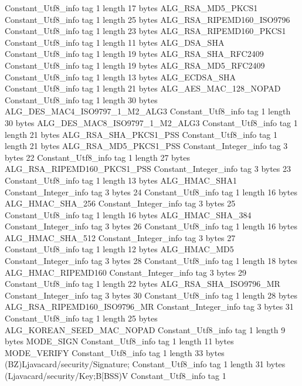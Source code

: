 {{{		}
		Constant_Utf8_info {
			tag	1
			length	17
			bytes	ALG_RSA_MD5_PKCS1
		}
		Constant_Utf8_info {
			tag	1
			length	25
			bytes	ALG_RSA_RIPEMD160_ISO9796
		}
		Constant_Utf8_info {
			tag	1
			length	23
			bytes	ALG_RSA_RIPEMD160_PKCS1
		}
		Constant_Utf8_info {
			tag	1
			length	11
			bytes	ALG_DSA_SHA
		}
		Constant_Utf8_info {
			tag	1
			length	19
			bytes	ALG_RSA_SHA_RFC2409
		}
		Constant_Utf8_info {
			tag	1
			length	19
			bytes	ALG_RSA_MD5_RFC2409
		}
		Constant_Utf8_info {
			tag	1
			length	13
			bytes	ALG_ECDSA_SHA
		}
		Constant_Utf8_info {
			tag	1
			length	21
			bytes	ALG_AES_MAC_128_NOPAD
		}
		Constant_Utf8_info {
			tag	1
			length	30
			bytes	ALG_DES_MAC4_ISO9797_1_M2_ALG3
		}
		Constant_Utf8_info {
			tag	1
			length	30
			bytes	ALG_DES_MAC8_ISO9797_1_M2_ALG3
		}
		Constant_Utf8_info {
			tag	1
			length	21
			bytes	ALG_RSA_SHA_PKCS1_PSS
		}
		Constant_Utf8_info {
			tag	1
			length	21
			bytes	ALG_RSA_MD5_PKCS1_PSS
		}
		Constant_Integer_info {
			tag	3
			bytes	22
		}
		Constant_Utf8_info {
			tag	1
			length	27
			bytes	ALG_RSA_RIPEMD160_PKCS1_PSS
		}
		Constant_Integer_info {
			tag	3
			bytes	23
		}
		Constant_Utf8_info {
			tag	1
			length	13
			bytes	ALG_HMAC_SHA1
		}
		Constant_Integer_info {
			tag	3
			bytes	24
		}
		Constant_Utf8_info {
			tag	1
			length	16
			bytes	ALG_HMAC_SHA_256
		}
		Constant_Integer_info {
			tag	3
			bytes	25
		}
		Constant_Utf8_info {
			tag	1
			length	16
			bytes	ALG_HMAC_SHA_384
		}
		Constant_Integer_info {
			tag	3
			bytes	26
		}
		Constant_Utf8_info {
			tag	1
			length	16
			bytes	ALG_HMAC_SHA_512
		}
		Constant_Integer_info {
			tag	3
			bytes	27
		}
		Constant_Utf8_info {
			tag	1
			length	12
			bytes	ALG_HMAC_MD5
		}
		Constant_Integer_info {
			tag	3
			bytes	28
		}
		Constant_Utf8_info {
			tag	1
			length	18
			bytes	ALG_HMAC_RIPEMD160
		}
		Constant_Integer_info {
			tag	3
			bytes	29
		}
		Constant_Utf8_info {
			tag	1
			length	22
			bytes	ALG_RSA_SHA_ISO9796_MR
		}
		Constant_Integer_info {
			tag	3
			bytes	30
		}
		Constant_Utf8_info {
			tag	1
			length	28
			bytes	ALG_RSA_RIPEMD160_ISO9796_MR
		}
		Constant_Integer_info {
			tag	3
			bytes	31
		}
		Constant_Utf8_info {
			tag	1
			length	25
			bytes	ALG_KOREAN_SEED_MAC_NOPAD
		}
		Constant_Utf8_info {
			tag	1
			length	9
			bytes	MODE_SIGN
		}
		Constant_Utf8_info {
			tag	1
			length	11
			bytes	MODE_VERIFY
		}
		Constant_Utf8_info {
			tag	1
			length	33
			bytes	(BZ)Ljavacard/security/Signature;
		}
		Constant_Utf8_info {
			tag	1
			length	31
			bytes	(Ljavacard/security/Key;B[BSS)V
		}
		Constant_Utf8_info {
			tag	1
}}}
